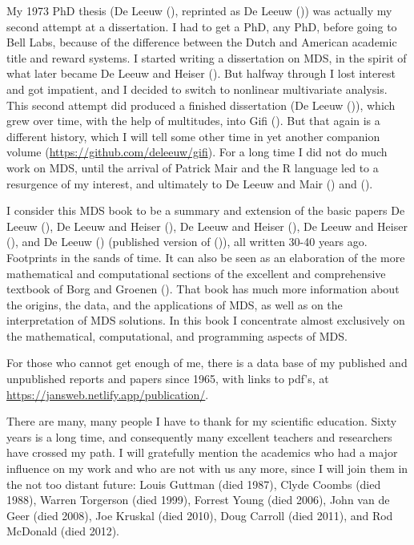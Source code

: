 \documentclass[
  12pt,
]{book}
\begin{document}
My 1973 PhD thesis (De Leeuw (), reprinted as De Leeuw ()) was
actually my second attempt at a dissertation. I had to get a PhD, any
PhD, before going to Bell Labs, because of the difference between the Dutch
and American academic title and reward systems. I started writing a
dissertation on MDS, in the spirit of what later became
De Leeuw and Heiser (). But halfway through I lost interest and got
impatient, and I decided to switch to nonlinear multivariate analysis.
This second attempt did produced a finished dissertation (De Leeuw ()), which
grew over time, with the help of multitudes, into Gifi (). But that again is a
different history, which I will tell some other time in yet another
companion volume (\url{https://github.com/deleeuw/gifi}). For a long time I did not do much work on MDS, until the arrival of Patrick Mair and the R language led to
a resurgence of my interest, and ultimately to De Leeuw and Mair () and
().

I consider this MDS book to be a summary and extension of the basic papers De Leeuw (),
De Leeuw and Heiser (), De Leeuw and Heiser (), De Leeuw and Heiser (), and
De Leeuw () (published version of ()), all written 30-40
years ago. Footprints in the sands of time. It can also be seen as an
elaboration of the more mathematical and computational sections of the excellent and comprehensive textbook of Borg and Groenen (). That book has much more
information about the origins, the data, and the applications of MDS, as
well as on the interpretation of MDS solutions. In this book I
concentrate almost exclusively on the mathematical, computational, and
programming aspects of MDS.

For those who cannot get enough of me, there is a data base of my
published and unpublished reports and papers since 1965, with links to pdf's, at
\url{https://jansweb.netlify.app/publication/}.

There are many, many people I have to thank for my scientific education.
Sixty years is a long time, and consequently many excellent teachers and
researchers have crossed my path. I will gratefully mention the academics who had a
major influence on my work and who are not with us any more, since I will join them in the not too distant future: Louis
Guttman (died 1987), Clyde Coombs (died 1988), Warren Torgerson (died 1999),
Forrest Young (died 2006), John van de Geer (died 2008), Joe Kruskal (died 2010), Doug Carroll (died 2011), and Rod McDonald (died 2012).
\end{document}
